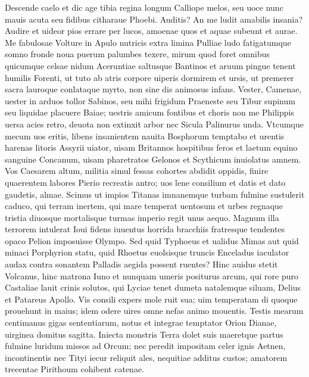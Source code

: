 \documentclass{book}
\newenvironment {carmen} [1] [\relax] 
  {\Titulus \Versus \incipit*\numerus{1}#1}
  {\endVersus}
\newcommand {\Alcaic}    {\Forma \strophae {0 \poena 01 \poena 2}}
\begin{document}
\begin{carmen}[\Alcaic]


Descende caelo et dic age tibia
 regina longum Calliope melos,
      seu uoce nunc mauis acuta
      seu fidibus citharaue Phoebi. 
Auditis? An me ludit amabilis               
 insania? Audire et uideor pios
      errare per lucos, amoenae
      quos et aquae subeunt et aurae. 
Me fabulosae Volture in Apulo
 nutricis extra limina Pulliae               
      ludo fatigatumque somno
      fronde noua puerum palumbes 
texere, mirum quod foret omnibus
 quicumque celsae nidum Aceruntiae
      saltusque Bantinos et aruum
      pingue tenent humilis Forenti,                
ut tuto ab atris corpore uiperis
 dormirem et ursis, ut premerer sacra
      lauroque conlataque myrto,
      non sine dis animosus infans.                
Vester, Camenae, uester in arduos
 tollor Sabinos, seu mihi frigidum
      Praeneste seu Tibur supinum
      seu liquidae placuere Baiae; 
uestris amicum fontibus et choris               
 non me Philippis uersa acies retro,
      deuota non extinxit arbor
      nec Sicula Palinurus unda. 
Vtcumque mecum uos eritis, libens
 insanientem nauita Bosphorum
      temptabo et urentis harenas               
      litoris Assyrii uiator, 
uisam Britannos hospitibus feros
 et laetum equino sanguine Concanum,
      uisam pharetratos Gelonos               
      et Scythicum inuiolatus amnem. 
Vos Caesarem altum, militia simul
 fessas cohortes abdidit oppidis,
      finire quaerentem labores
      Pierio recreatis antro;                
uos lene consilium et datis et dato
 gaudetis, almae. Scimus ut impios
      Titanas imnanemque turbam
      fulmine sustulerit caduco, 
qui terram inertem, qui mare temperat               
 uentosum et urbes regnaque tristia
      diuosque mortalisque turmas
      imperio regit unus aequo. 
Magnum illa terrorem intulerat Ioui
 fidens iuuentus horrida bracchiis               
      fratresque tendentes opaco
      Pelion imposuisse Olympo. 
Sed quid Typhoeus et ualidus Mimas
 aut quid minaci Porphyrion statu,
      quid Rhoetus euolsisque truncis               
      Enceladus iaculator audax 
contra sonantem Palladis aegida
 possent ruentes? Hinc auidus stetit
      Volcanus, hinc matrona Iuno et
      nunquam umeris positurus arcum,                
qui rore puro Castaliae lauit
 crinis solutos, qui Lyciae tenet
      dumeta natalemque siluam,
      Delius et Patareus Apollo. 
Vis consili expers mole ruit sua;               
 uim temperatam di quoque prouehunt
      in maius; idem odere uires
      omne nefas animo mouentis. 
Testis mearum centimanus gigas
 sententiarum, notus et integrae               
      temptator Orion Dianae,
      uirginea domitus sagitta. 
Iniecta monstris Terra dolet suis
 maeretque partus fulmine luridum
      missos ad Orcum; nec peredit               
      impositam celer ignis Aetnen, 
incontinentis nec Tityi iecur
 reliquit ales, nequitiae additus
      custos; amatorem trecentae
      Pirithoum cohibent catenae.                

\end{carmen}
\end{document}
